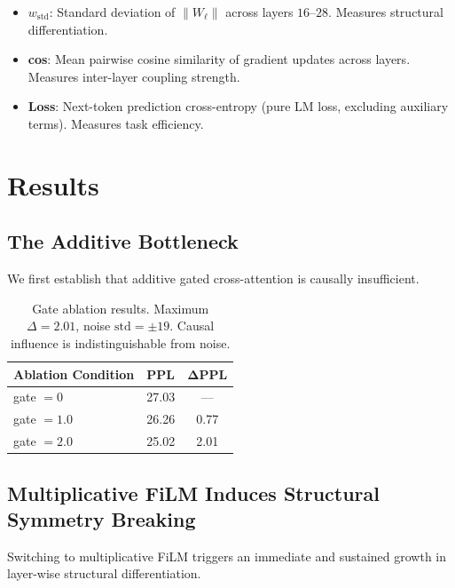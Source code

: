 \documentclass[11pt,a4paper]{article}
\begin{document}
\begin{itemize}
  \item $w_{\mathrm{std}}$: Standard deviation of $\|W_\ell\|$ across layers
    $16$--$28$. Measures structural differentiation.
  \item \textbf{cos}: Mean pairwise cosine similarity of gradient updates across
    layers. Measures inter-layer coupling strength.
  \item \textbf{Loss}: Next-token prediction cross-entropy (pure LM loss, excluding
    auxiliary terms). Measures task efficiency.
\end{itemize}

\section{Results}

\subsection{The Additive Bottleneck}

We first establish that additive gated cross-attention is causally insufficient.

\begin{table}[h]
\centering
\begin{tabular}{lcc}
\toprule
\textbf{Ablation Condition} & \textbf{PPL} & $\boldsymbol{\Delta}$\textbf{PPL} \\
\midrule
gate $= 0$      & 27.03 & ---  \\
gate $= 1.0$    & 26.26 & 0.77 \\
gate $= 2.0$    & 25.02 & 2.01 \\
\bottomrule
\end{tabular}
\caption{Gate ablation results. Maximum $\Delta = 2.01$, noise
$\mathrm{std} = \pm 19$. Causal influence is indistinguishable from noise.}
\end{table}

\subsection{Multiplicative FiLM Induces Structural Symmetry Breaking}

Switching to multiplicative FiLM triggers an immediate and sustained growth in
layer-wise structural differentiation.
\end{document}
